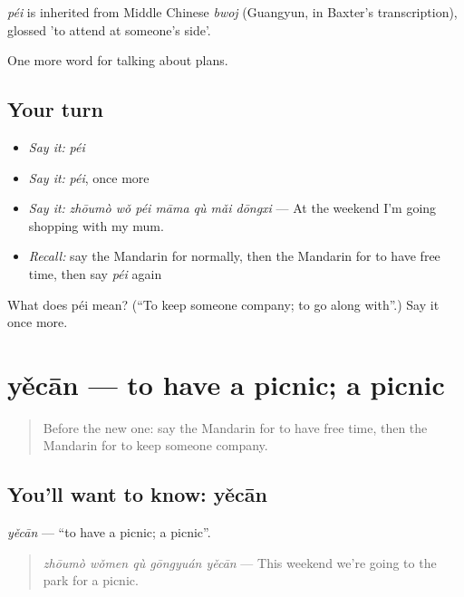 \begin{cousinweb}
\emph{péi} is inherited from Middle Chinese \emph{bwoj} (Guangyun, in Baxter's transcription), glossed 'to attend at someone's side'.
\end{cousinweb}

\begin{grammarlens}[title={What you've built}]
One more word for talking about plans.
\end{grammarlens}

\subsection*{Your turn}
\begin{itemize}
\raggedright
  \item \emph{Say it:} \emph{péi}
  \item \emph{Say it:} \emph{péi}, once more
  \item \emph{Say it:} \emph{zhōumò wǒ péi māma qù mǎi dōngxi} — At the weekend I'm going shopping with my mum.
  \item \emph{Recall:} say the Mandarin for normally, then the Mandarin for to have free time, then say \emph{péi} again
\end{itemize}

\begin{tcolorbox}[breakable,colback=teal!4,colframe=teal!35!black,title={Before you move on}]
What does péi mean? (\textquotedblleft{}To keep someone company; to go along with\textquotedblright{}.) Say it once more.
\end{tcolorbox}
\section[yěcān]{yěcān — to have a picnic; a picnic}

\label{lesson:ZH-C163-yecan}



\begin{quote}
Before the new one: say the Mandarin for to have free time, then the Mandarin for to keep someone company.
\end{quote}

\subsection*{You'll want to know: yěcān}
\emph{yěcān} — \textquotedblleft{}to have a picnic; a picnic\textquotedblright{}.

\begin{quote}
\emph{zhōumò wǒmen qù gōngyuán yěcān} — This weekend we're going to the park for a picnic.
\end{quote}

